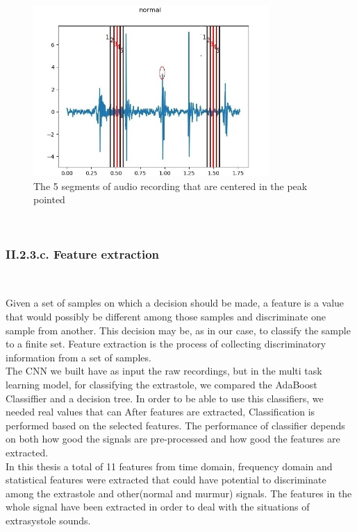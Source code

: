 \documentclass[11pt, a4papper]{report}
\theoremstyle{plain}
\theoremstyle{definition}
\theoremstyle{definition}
\theoremstyle{proposition}
\begin{document}
\begin{figure}[H]
\includegraphics[width=9cm]{sw.jpg}
\centering
\caption{The 5 segments of audio recording that are centered in the peak pointed}
\end{figure}
\


\subsubsection*{II.2.3.c. Feature extraction}

\

Given a set of samples on which a decision should be made, a feature is a value that would possibly be different among those samples and discriminate one sample from another. This decision may be, as in our case, to classify the sample to a finite set. Feature extraction is the process of collecting discriminatory information from a set of samples.
\\

The CNN we built have as input the raw recordings, but in the multi task learning model, for classifying the extrastole, we compared the AdaBoost Classiffier and a decision tree. In order to be able to use this classifiers, we needed real values that can  After features are extracted, Classification is performed based on the selected features. The performance of classifier depends on both how good the signals are pre-processed and how good the features are extracted. \cite{14}
\\

In this thesis a total of 11 features from time domain, frequency domain and statistical features were extracted that could have potential to discriminate among the extrastole and other(normal and murmur) signals. The features in the whole signal have been extracted in order to deal with the situations of extrasystole sounds. \cite{7}
\
\end{document}
